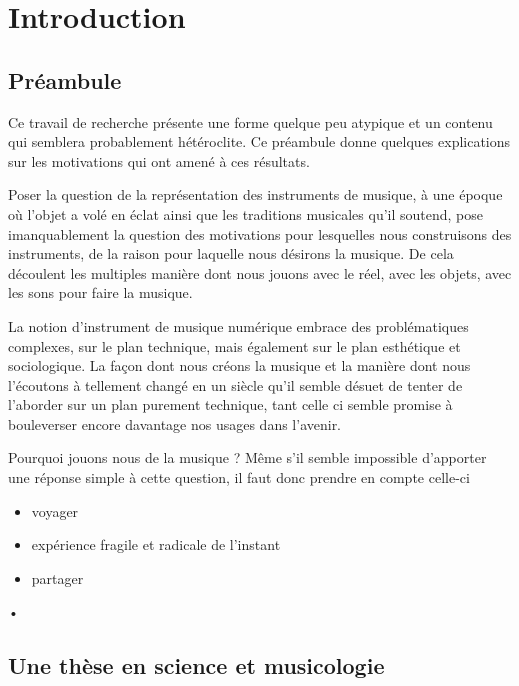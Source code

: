%
\chapter{Introduction}
\label{ch:introduction}
%

\section{Préambule}

Ce travail de recherche présente une forme quelque peu atypique et un contenu qui semblera probablement hétéroclite. Ce préambule donne quelques explications sur les motivations qui ont amené à ces résultats.

Poser la question de la représentation des instruments de musique, à une époque où l’objet a volé en éclat ainsi que les traditions musicales qu’il soutend, pose imanquablement la question des motivations pour lesquelles nous construisons des instruments, de la raison pour laquelle nous désirons la musique. De cela découlent les multiples manière dont nous jouons avec le réel, avec les objets, avec les sons pour faire la musique.

La notion d’instrument de musique numérique embrace des problématiques complexes, sur le plan technique, mais également sur le plan esthétique et sociologique. La façon dont nous créons la musique et la manière dont nous l’écoutons à tellement changé en un siècle qu’il semble désuet de tenter de l’aborder sur un plan purement technique, tant celle ci semble promise à bouleverser encore davantage nos usages dans l’avenir.

Pourquoi jouons nous de la musique ?
Même s’il semble impossible d’apporter une réponse simple à cette question, il faut donc prendre en compte celle-ci 

\vspace{-1em}
\begin{itemize}[noitemsep]
\item voyager
\item expérience fragile et radicale de l’instant
\item partager
\end{itemize}•



\section{Une thèse en science et musicologie}

